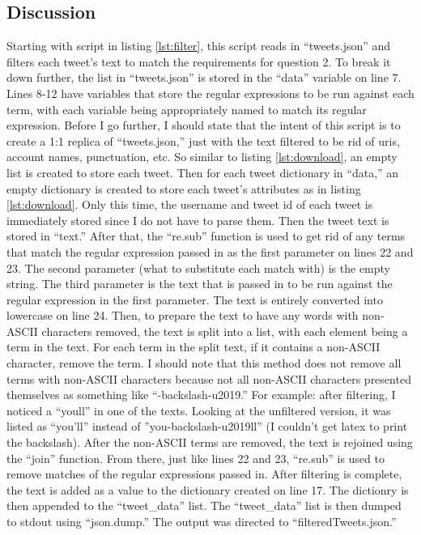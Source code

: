 \documentclass[12pt]{article}
\begin{document}
\subsection*{Discussion}
Starting with script in listing \ref{lst:filter}, this script reads in ``tweets.json'' and filters each tweet's text to match the requirements for question 2.  To break it down further, the list in ``tweets.json'' is stored in the ``data'' variable on line 7.  Lines 8-12 have variables that store the regular expressions to be run against each term, with each variable being appropriately named to match its regular expression.  Before I go further, I should state that the intent of this script is to create a 1:1 replica of ``tweets.json,'' just with the text filtered to be rid of uris, account names, punctuation, etc.  So similar to listing \ref{lst:download}, an empty list is created to store each tweet.  Then for each tweet dictionary in ``data,'' an empty dictionary is created to store each tweet's attributes as in listing \ref{lst:download}.  Only this time, the username and tweet id of each tweet is immediately stored since I do not have to parse them.  Then the tweet text is stored in ``text.''  After that, the ``re.sub'' function is used to get rid of any terms that match the regular expression passed in as the first parameter on lines 22 and 23.  The second parameter (what to substitute each match with) is the empty string.  The third parameter is the text that is passed in to be run against the regular expression in the first parameter.  The text is entirely converted into lowercase on line 24.  Then, to prepare the text to have any words with non-ASCII characters removed, the text is split into a list, with each element being a term in the text.  For each term in the split text, if it contains a non-ASCII character, remove the term.  I should note that this method does not remove all terms with non-ASCII characters because not all non-ASCII characters presented themselves as something like ``-backslash-u2019.''  For example: after filtering, I noticed a ``youll'' in one of the texts.  Looking at the unfiltered version, it was listed as ``you'll'' instead of ''you-backslash-u2019ll'' (I couldn't get latex to print the backslash).  After the non-ASCII terms are removed, the text is rejoined using the ``join'' function.  From there, just like lines 22 and 23, ``re.sub'' is used to remove matches of the regular expressions passed in.  After filtering is complete, the text is added as a value to the dictionary created on line 17.  The dictionry is then appended to the ``tweet\_data'' list.  The ``tweet\_data'' list is then dumped to stdout using ``json.dump.''  The output was directed to ``filteredTweets.json.''
\end{document}
